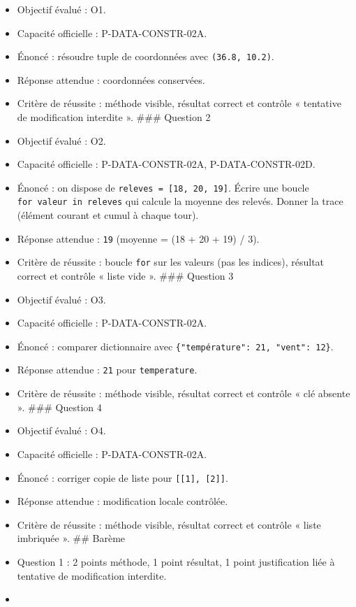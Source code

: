 \begin{itemize}
\tightlist
\item
  Objectif évalué : O1.
\item
  Capacité officielle : P-DATA-CONSTR-02A.
\item
  Énoncé : résoudre tuple de coordonnées avec \texttt{(36.8,\ 10.2)}.
\item
  Réponse attendue : coordonnées conservées.
\item
  Critère de réussite : méthode visible, résultat correct et contrôle «
  tentative de modification interdite ». \#\#\# Question 2
\item
  Objectif évalué : O2.
\item
  Capacité officielle : P-DATA-CONSTR-02A, P-DATA-CONSTR-02D.
\item
  Énoncé : on dispose de \texttt{releves\ =\ {[}18,\ 20,\ 19{]}}. Écrire
  une boucle \texttt{for\ valeur\ in\ releves} qui calcule la moyenne
  des relevés. Donner la trace (élément courant et cumul à chaque tour).
\item
  Réponse attendue : \texttt{19} (moyenne = (18 + 20 + 19) / 3).
\item
  Critère de réussite : boucle \texttt{for} sur les valeurs (pas les
  indices), résultat correct et contrôle « liste vide ». \#\#\# Question
  3
\item
  Objectif évalué : O3.
\item
  Capacité officielle : P-DATA-CONSTR-02A.
\item
  Énoncé : comparer dictionnaire avec
  \texttt{\{"température":\ 21,\ "vent":\ 12\}}.
\item
  Réponse attendue : \texttt{21} pour \texttt{temperature}.
\item
  Critère de réussite : méthode visible, résultat correct et contrôle «
  clé absente ». \#\#\# Question 4
\item
  Objectif évalué : O4.
\item
  Capacité officielle : P-DATA-CONSTR-02A.
\item
  Énoncé : corriger copie de liste pour
  \texttt{{[}{[}1{]},\ {[}2{]}{]}}.
\item
  Réponse attendue : modification locale contrôlée.
\item
  Critère de réussite : méthode visible, résultat correct et contrôle «
  liste imbriquée ». \#\# Barème
\item
  Question 1 : 2 points méthode, 1 point résultat, 1 point justification
  liée à tentative de modification interdite.
\item

\end{itemize}
